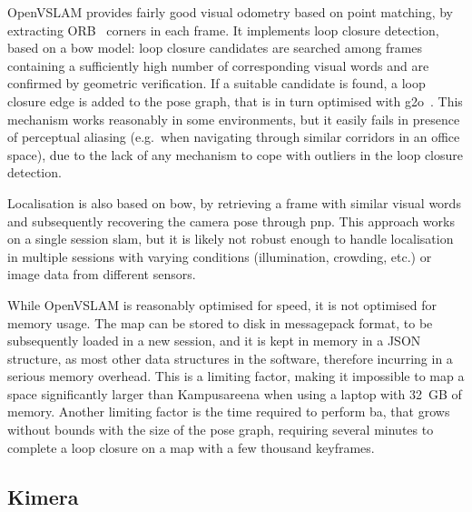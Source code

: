 \documentclass[11pt, letterpaper, twoside]{article}
\begin{document}
OpenVSLAM provides fairly good visual odometry based on point matching, by
extracting ORB~\cite{rublee2011orb} corners in each frame. It implements loop
closure detection, based on a \gls{bow} model: loop closure candidates are
searched among frames containing a sufficiently high number of corresponding
visual words and are confirmed by geometric verification. If a suitable
candidate is found, a loop closure edge is added to the pose graph, that is in
turn optimised with g2o~\cite{grisetti2011g2o}. This mechanism works reasonably
in some environments, but it easily fails in presence of perceptual aliasing
(e.g.\ when navigating through similar corridors in an office space), due to
the lack of any mechanism to cope with outliers in the loop closure detection.

Localisation is also based on \gls{bow}, by retrieving a frame with similar
visual words and subsequently recovering the camera pose through \gls{pnp}.
This approach works on a single session \gls{slam}, but it is likely not robust
enough to handle localisation in multiple sessions with varying conditions
(illumination, crowding, etc.) or image data from different sensors.

While OpenVSLAM is reasonably optimised for speed, it is not optimised for
memory usage. The map can be stored to disk in messagepack format, to be
subsequently loaded in a new session, and it is kept in memory in a JSON
structure, as most other data structures in the software, therefore incurring
in a serious memory overhead. This is a limiting factor, making it impossible
to map a space significantly larger than Kampusareena when using a laptop with
32~GB of memory. Another limiting factor is the time required to perform
\gls{ba}, that grows without bounds with the size of the pose graph, requiring
several minutes to complete a loop closure on a map with a few thousand
keyframes.

\subsection{Kimera}
\end{document}
